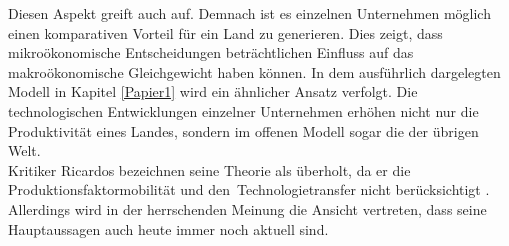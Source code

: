 %
Diesen Aspekt greift auch \cite{Helpman.2011} auf. Demnach ist es einzelnen Unternehmen möglich einen komparativen Vorteil für ein Land zu generieren. Dies zeigt, dass mikroökonomische Entscheidungen beträchtlichen Einfluss auf das makroökonomische Gleichgewicht haben können. In dem ausführlich dargelegten Modell in Kapitel \ref{Papier1} wird ein ähnlicher Ansatz verfolgt. Die technologischen Entwicklungen einzelner Unternehmen erhöhen nicht nur die Produktivität eines Landes, sondern im offenen Modell sogar die der übrigen Welt.\\
%
Kritiker Ricardos bezeichnen seine Theorie als überholt, da er die Produktionsfaktormobilität und den~Technologietransfer nicht berücksichtigt \cite{Irwin.2009}. Allerdings wird in der herrschenden Meinung die Ansicht vertreten, dass seine Hauptaussagen auch heute immer noch aktuell sind.
%
